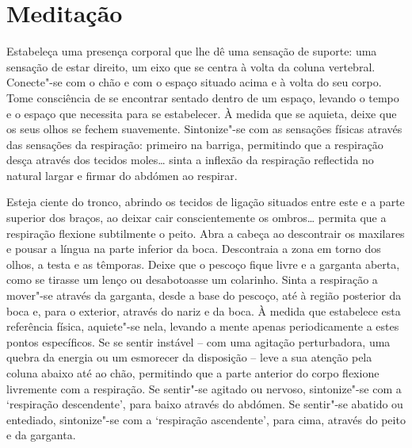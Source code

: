 
\chapter{Meditação}


Estabeleça uma presença corporal que lhe dê uma sensação de suporte: uma
sensação de estar direito, um eixo que se centra à volta da coluna vertebral.
Conecte"-se com o chão e com o espaço situado acima e à volta do seu corpo. Tome
consciência de se encontrar sentado dentro de um espaço, levando o tempo e o
espaço que necessita para se estabelecer. À medida que se aquieta, deixe que os
seus olhos se fechem suavemente. Sintonize"-se com as sensações físicas através
das sensações da respiração: primeiro na barriga, permitindo que a respiração
desça através dos tecidos moles\ldots{} sinta a inflexão da respiração
reflectida no natural largar e firmar do abdómen ao respirar.

Esteja ciente do tronco, abrindo os tecidos de ligação situados entre este e a
parte superior dos braços, ao deixar cair conscientemente os ombros\ldots{}
permita que a respiração flexione subtilmente o peito. Abra a cabeça ao
descontrair os maxilares e pousar a língua na parte inferior da boca.
Descontraia a zona em torno dos olhos, a testa e as têmporas. Deixe que o
pescoço fique livre e a garganta aberta, como se tirasse um lenço ou
desabotoasse um colarinho. Sinta a respiração a mover"-se através da garganta,
desde a base do pescoço, até à região posterior da boca e, para o exterior,
através do nariz e da boca. À medida que estabelece esta referência física,
aquiete"-se nela, levando a mente apenas periodicamente a estes pontos
específicos. Se se sentir instável -- com uma agitação perturbadora, uma quebra
da energia ou um esmorecer da disposição -- leve a sua atenção pela coluna
abaixo até ao chão, permitindo que a parte anterior do corpo flexione livremente
com a respiração. Se sentir"-se agitado ou nervoso, sintonize"-se com a
`respiração descendente', para baixo através do abdómen. Se sentir"-se abatido
ou entediado, sintonize"-se com a `respiração ascendente', para cima, através do
peito e da garganta.

